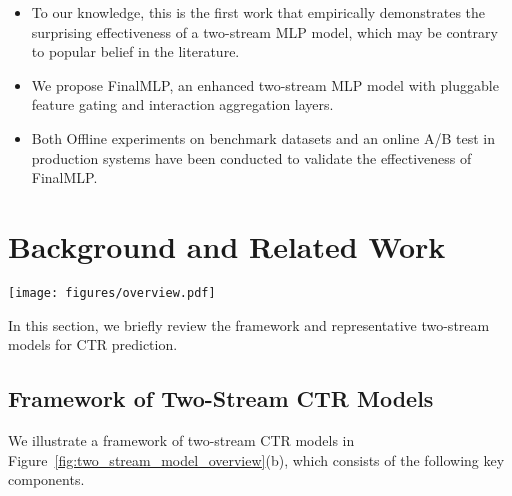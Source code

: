 \documentclass[letterpaper]{article} \usepackage{aaai23}  \usepackage{times}  \usepackage{helvet}  \usepackage{courier}  \usepackage[hyphens]{url}  \usepackage{graphicx} \urlstyle{rm} \def\UrlFont{\rm}  \usepackage{natbib}  \usepackage{caption} \frenchspacing  \setlength{\pdfpagewidth}{8.5in}  \setlength{\pdfpageheight}{11in}  \usepackage{algorithm}
\begin{document}
\begin{itemize}
    \item To our knowledge, this is the first work that empirically demonstrates the surprising effectiveness of a two-stream MLP model, which may be contrary to popular belief in the literature.
    \item We propose FinalMLP, an enhanced two-stream MLP model with pluggable feature gating and interaction aggregation layers.
    \item Both Offline experiments on benchmark datasets and an online A/B test in production systems have been conducted to validate the effectiveness of FinalMLP.
\end{itemize}






































%
 \section{Background and Related Work}


\begin{figure*}[!t]
	\centering
	\texttt{[image: figures/overview.pdf]}\caption{(a) An illustration of stream-specific feature selection. (b) A general framework of two-stream CTR models. (c) The multi-head bilinear fusion.}
\label{fig:two_stream_model_overview}
\end{figure*}


In this section, we briefly review the framework and representative two-stream models for CTR prediction.

\subsection{Framework of Two-Stream CTR Models}
\label{sec:framework}
We illustrate a framework of two-stream CTR models in Figure~\ref{fig:two_stream_model_overview}(b), which consists of the following key components.
\end{document}
